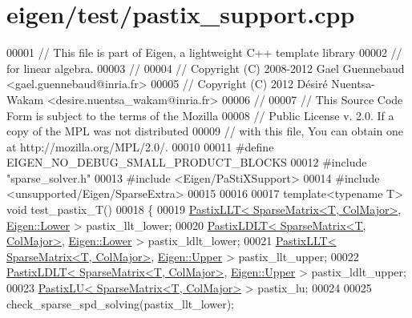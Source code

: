 \hypertarget{eigen_2test_2pastix__support_8cpp_source}{}\section{eigen/test/pastix\+\_\+support.cpp}
\label{eigen_2test_2pastix__support_8cpp_source}

\begin{DoxyCode}
00001 \textcolor{comment}{// This file is part of Eigen, a lightweight C++ template library}
00002 \textcolor{comment}{// for linear algebra.}
00003 \textcolor{comment}{//}
00004 \textcolor{comment}{// Copyright (C) 2008-2012 Gael Guennebaud <gael.guennebaud@inria.fr>}
00005 \textcolor{comment}{// Copyright (C) 2012 Désiré Nuentsa-Wakam <desire.nuentsa\_wakam@inria.fr>}
00006 \textcolor{comment}{//}
00007 \textcolor{comment}{// This Source Code Form is subject to the terms of the Mozilla}
00008 \textcolor{comment}{// Public License v. 2.0. If a copy of the MPL was not distributed}
00009 \textcolor{comment}{// with this file, You can obtain one at http://mozilla.org/MPL/2.0/.}
00010 
00011 \textcolor{preprocessor}{#define EIGEN\_NO\_DEBUG\_SMALL\_PRODUCT\_BLOCKS}
00012 \textcolor{preprocessor}{#include "sparse\_solver.h"}
00013 \textcolor{preprocessor}{#include <Eigen/PaStiXSupport>}
00014 \textcolor{preprocessor}{#include <unsupported/Eigen/SparseExtra>}
00015 
00016 
00017 \textcolor{keyword}{template}<\textcolor{keyword}{typename} T> \textcolor{keywordtype}{void} test\_pastix\_T()
00018 \{
00019   \hyperlink{class_eigen_1_1_pastix_l_l_t}{PastixLLT< SparseMatrix<T, ColMajor>}, 
      \hyperlink{group__enums_gga39e3366ff5554d731e7dc8bb642f83cda891792b8ed394f7607ab16dd716f60e6}{Eigen::Lower} > pastix\_llt\_lower;
00020   \hyperlink{class_eigen_1_1_pastix_l_d_l_t}{PastixLDLT< SparseMatrix<T, ColMajor>}, 
      \hyperlink{group__enums_gga39e3366ff5554d731e7dc8bb642f83cda891792b8ed394f7607ab16dd716f60e6}{Eigen::Lower} > pastix\_ldlt\_lower;
00021   \hyperlink{class_eigen_1_1_pastix_l_l_t}{PastixLLT< SparseMatrix<T, ColMajor>}, 
      \hyperlink{group__enums_gga39e3366ff5554d731e7dc8bb642f83cda6bcb58be3b8b8ec84859ce0c5ac0aaec}{Eigen::Upper} > pastix\_llt\_upper;
00022   \hyperlink{class_eigen_1_1_pastix_l_d_l_t}{PastixLDLT< SparseMatrix<T, ColMajor>}, 
      \hyperlink{group__enums_gga39e3366ff5554d731e7dc8bb642f83cda6bcb58be3b8b8ec84859ce0c5ac0aaec}{Eigen::Upper} > pastix\_ldlt\_upper;
00023   \hyperlink{class_eigen_1_1_pastix_l_u}{PastixLU< SparseMatrix<T, ColMajor>} > pastix\_lu;
00024 
00025   check\_sparse\_spd\_solving(pastix\_llt\_lower);

\end{DoxyCode}
